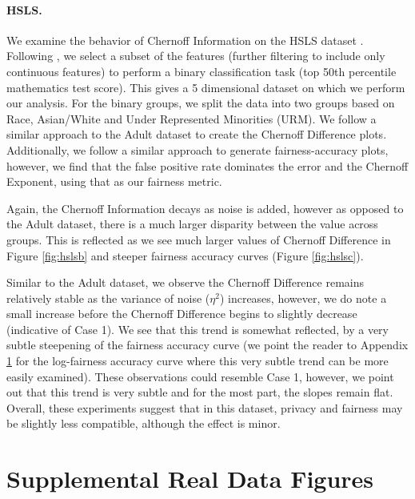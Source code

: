 \documentclass[11pt,letterpaper]{article}
\begin{document}
\paragraph{HSLS.} We examine the behavior of Chernoff Information on the HSLS dataset \citep{ingels2011hsls}. %
Following \citet{jeong2022fairness}, we select a subset of the features (further filtering to include only continuous features) to perform a binary classification task (top 50th percentile mathematics test score). This gives a 5 dimensional dataset on which we perform our analysis. For the binary groups, we split the data into two groups based on Race, Asian/White and Under Represented Minorities (URM). We follow a similar approach to the Adult dataset to create the Chernoff Difference plots. Additionally, we follow a similar approach to generate fairness-accuracy plots, however, we find that the false positive rate dominates the error and the Chernoff Exponent, using that as our fairness metric.

Again, the Chernoff Information decays as noise is added, however as opposed to the Adult dataset, there is a much larger disparity between the value across groups. This is reflected as we see much larger values of Chernoff Difference in Figure \ref{fig:hslsb} and steeper fairness accuracy curves (Figure \ref{fig:hslsc}). 

Similar to the Adult dataset, we observe the Chernoff Difference remains relatively stable as the variance of noise ($\eta^2$) increases, however, we do note a small increase before the Chernoff Difference begins to slightly decrease (indicative of Case 1). We see that this trend is somewhat reflected, by a very subtle steepening of the fairness accuracy curve (we point the reader to Appendix \ref{sec:suppdat} for the log-fairness accuracy curve where this very subtle trend can be more easily examined). These observations could resemble Case 1, however, we point out that this trend is very subtle and for the most part, the slopes remain flat. Overall, these experiments suggest that in this dataset, privacy and fairness may be slightly less compatible, although the effect is minor.

\newpage
\section{Supplemental Real Data Figures} \label{sec:suppdat}
\end{document}
